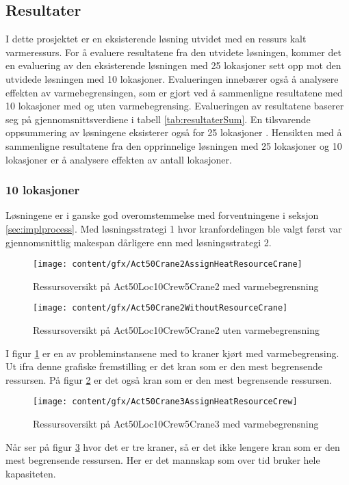 \subsection{Resultater}
I dette prosjektet er en eksisterende løsning utvidet med en ressurs kalt varmeressurs. For å evaluere resultatene fra den utvidete løsningen, kommer det en evaluering av den eksisterende løsningen med 25 lokasjoner sett opp mot den utvidede løsningen med 10 lokasjoner. Evalueringen innebærer også å analysere effekten av varmebegrensingen, som er gjort ved å sammenligne resultatene med 10 lokasjoner med og uten varmebegrensing. Evalueringen av resultatene baserer seg på gjennomsnittsverdiene i tabell \ref{tab:resultaterSum}. En tilsvarende oppsummering av løsningene eksisterer også for 25 lokasjoner \cite{tvedtbezem}. Hensikten med å sammenligne resultatene fra den opprinnelige løsningen med 25 lokasjoner og 10 lokasjoner er å analysere effekten av antall lokasjoner.

\subsubsection{10 lokasjoner}
Løsningene er i ganske god overomstemmelse med forventningene i seksjon \ref{sec:implprocess}. Med løsningsstrategi 1 hvor kranfordelingen ble valgt først var gjennomsnittlig makespan dårligere enn med løsningsstrategi 2.

\begin{figure}[!h]
\centering
\texttt{[image: content/gfx/Act50Crane2AssignHeatResourceCrane]}
\caption{Ressursoversikt på Act50Loc10Crew5Crane2 med varmebegrensning}
\label{fig:RessursWithAct50Loc10Crew5Crane2}
\end{figure}
\begin{figure}[!h]
\centering
\texttt{[image: content/gfx/Act50Crane2WithoutResourceCrane]}
\caption{Ressursoversikt på Act50Loc10Crew5Crane2 uten varmebegrensning}
\label{fig:RessursWithoutAct50Loc10Crew5Crane2}
\end{figure}
I figur \ref{fig:RessursWithAct50Loc10Crew5Crane2} er en av probleminstansene med to kraner kjørt med varmebegrensing. Ut ifra denne grafiske fremstilling er det kran som er den mest begrensende ressursen. På figur \ref{fig:RessursWithoutAct50Loc10Crew5Crane2} er det også kran som er den mest begrensende ressursen.
\begin{figure}[!h]
\centering
\texttt{[image: content/gfx/Act50Crane3AssignHeatResourceCrew]}
\caption{Ressursoversikt på Act50Loc10Crew5Crane3 med varmebegrensning}
\label{fig:RessursWithAct50Loc10Crew5Crane3}
\end{figure}
Når ser på figur \ref{fig:RessursWithAct50Loc10Crew5Crane3} hvor det er tre kraner, så er det ikke lengere kran som er den mest begrensende ressursen. Her er det mannskap som over tid bruker hele kapasiteten.

